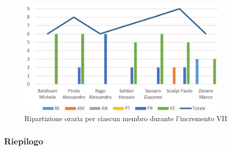 \begin{figure}[!htb]   
    \centering
    \includegraphics[width=0.9\textwidth]{Images/inc7}
	\caption{Ripartizione oraria per ciascun membro durante l'incremento VII}
\end{figure}

\subsubsection{Riepilogo}


